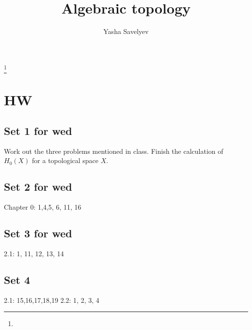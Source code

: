 \documentclass{amsart}
\numberwithin{equation}{section}
\theoremstyle{definition}
\theoremstyle{remark}
\begin{document}
\title{Algebraic topology}
\author{Yasha Savelyev}
\thanks {}
\address{University of Colima, CUICBAS}
\keywords{}
\maketitle
\section{HW}
\subsection{Set 1 for wed} \label{sec_Set 1 for wed} 
Work out the three problems mentioned in class. Finish the
calculation of $H _{0} (X) $ for a topological space $X$. 
\subsection{Set 2 for wed}
Chapter 0: 1,4,5, 6, 11, 16 
\subsection{Set 3 for wed}
2.1: 1, 11, 12, 13, 14 
\subsection{Set 4}
2.1: 15,16,17,18,19
2.2: 1, 2, 3, 4
% 
% 
\end{document}
